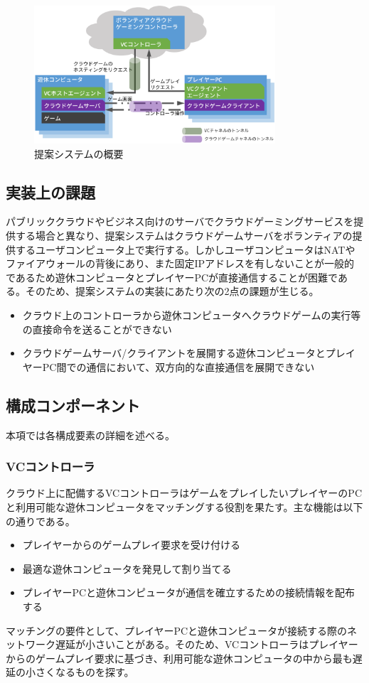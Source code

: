 \begin{figure}[t]
    \centering
    \includegraphics[width=0.8\textwidth,keepaspectratio,clip]{img/architecture.eps}
    \caption{提案システムの概要}
    \label{fig:arch}
\end{figure}

\subsection{実装上の課題}
パブリッククラウドやビジネス向けのサーバでクラウドゲーミングサービスを提供する場合と異なり、提案システムはクラウドゲームサーバをボランティアの提供するユーザコンピュータ上で実行する。しかしユーザコンピュータはNATやファイアウォールの背後にあり、また固定IPアドレスを有しないことが一般的であるため遊休コンピュータとプレイヤーPCが直接通信することが困難である。そのため、提案システムの実装にあたり次の2点の課題が生じる。
\begin{itemize}
    \item クラウド上のコントローラから遊休コンピュータへクラウドゲームの実行等の直接命令を送ることができない
    \item クラウドゲームサーバ/クライアントを展開する遊休コンピュータとプレイヤーPC間での通信において、双方向的な直接通信を展開できない
\end{itemize}

\subsection{構成コンポーネント}
本項では各構成要素の詳細を述べる。

\subsubsection{VCコントローラ}
クラウド上に配備するVCコントローラはゲームをプレイしたいプレイヤーのPCと利用可能な遊休コンピュータをマッチングする役割を果たす。主な機能は以下の通りである。
\begin{itemize}
    \item プレイヤーからのゲームプレイ要求を受け付ける
    \item 最適な遊休コンピュータを発見して割り当てる
    \item プレイヤーPCと遊休コンピュータが通信を確立するための接続情報を配布する
\end{itemize}
マッチングの要件として、プレイヤーPCと遊休コンピュータが接続する際のネットワーク遅延が小さいことがある。そのため、VCコントローラはプレイヤーからのゲームプレイ要求に基づき、利用可能な遊休コンピュータの中から最も遅延の小さくなるものを探す。

